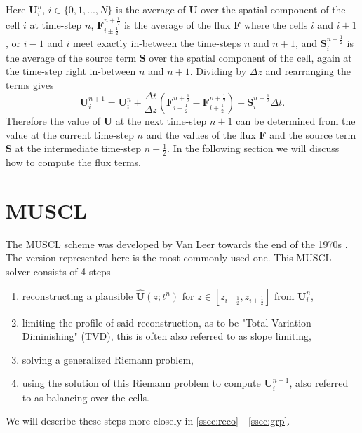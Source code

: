 \documentclass[a4paper, oneside]{discothesis}
\begin{document}
Here $\mathbf{U}_i^n$, $i \in \{0,1,...,N\}$ is the average of $\mathbf{U}$ over the spatial component of the cell $i$ at time-step $n$,
$\mathbf{F}_{i \pm \frac{1}{2}}^{n + \frac{1}{2}}$ is the average of the flux $\mathbf{F}$ where the cells $i$ and $i+1$, or  $i-1$ and $i$  meet exactly in-between the time-steps $n$ and $n + 1$, and $\mathbf{S}_i^{n+\frac{1}{2}}$ is the average of the source term $\mathbf{S}$ over the spatial component of the cell, again at the time-step right in-between $n$ and $n+1$.
Dividing by $\Delta z$ and rearranging the terms gives
\begin{equation}
	\mathbf{U} _i^{n+1} = \mathbf{U}_i^n + \frac{\Delta t}{\Delta z} (\mathbf{F}_{i-\frac{1}{2}}^{n+\frac{1}{2}} - \mathbf{F}_{i+\frac{1}{2}}^{n+\frac{1}{2}}) + \mathbf{S}_i^{n+\frac{1}{2}} \Delta t. \label{eq:fv}
\end{equation}
Therefore the value of $\mathbf{U}$ at the next time-step $n+1$ can be determined from the value at the current time-step $n$ and the values of the flux $\mathbf{F}$ and the source term $\mathbf{S}$ at the intermediate time-step $n + \frac{1}{2}$. \cite{guinot2012wave}
In the following section we will discuss how to compute the flux terms.

\section{MUSCL} \label{sec:muscl}
The MUSCL scheme was developed by Van Leer towards the end of the 1970s \cite{van1977towards} \cite{van1979towards}.
The version represented here is the most commonly used one.
This MUSCL solver consists of 4 steps
\begin{enumerate}
	\item reconstructing a plausible $\mathbf{\hat{U}}(z;t^n)$ for $z \in [z_{i-\frac{1}{2}}, z_{i+\frac{1}{2}}]$ from $\mathbf{U}_i^n$,
	\item limiting the profile of said reconstruction, as to be "Total Variation Diminishing" (TVD), this is often also referred to as slope limiting,
	\item solving a generalized Riemann problem,
	\item using the solution of this Riemann problem to compute $\mathbf{U}_i^{n+1}$, also referred to as balancing over the cells.
\end{enumerate}
We will describe these steps more closely in \autoref{ssec:reco} - \autoref{ssec:grp}.
\end{document}
